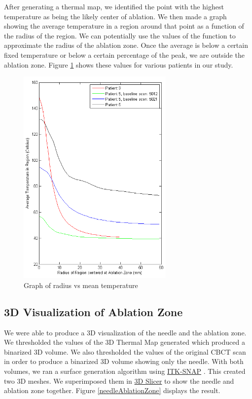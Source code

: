 \documentclass[]{spie}  %
\begin{document}
After generating a thermal map, we identified the point with the highest temperature as being the likely center of ablation. We then made a graph showing the average temperature in a region around that point as a function of the radius of the region. We can potentially use the values of the function to approximate the radius of the ablation zone. Once the average is below a certain fixed temperature or below a certain percentage of the peak, we are outside the ablation zone. Figure \ref{graphRadMean} shows these values for various patients in our study. 

\begin{figure} 
\centering 
\includegraphics[width=3in]{meanTempVsRadiusFull.png} 
\caption{Graph of radius vs mean temperature} 
\label{graphRadMean}
\end{figure}


\subsection{3D Visualization of Ablation Zone}

We were able to produce a 3D visualization of the needle and the ablation zone. We thresholded the values of the 3D Thermal Map generated which produced a binarized 3D volume. We also thresholded the values of the original CBCT scan in order to produce a binarized 3D volume showing only the needle. With both volumes, we ran a surface generation algorithm using \href{www.itksnap.org}{ITK-SNAP} \cite{Yushkevich06}. This created two 3D meshes. We superimposed them in \href{http://www.slicer.org/}{3D Slicer} \cite{Fedorov12} to show the needle and ablation zone together. Figure \ref{needleAblationZone} displays the result.
\end{document}
